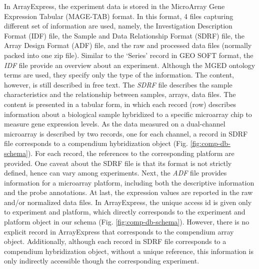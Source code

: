 %
In ArrayExpress, the experiment data is stored in the MicroArray Gene
Expression Tabular (MAGE-TAB) format.
%
In this format, 4 files capturing different set of information are used,
namely, the Investigation Description Format (IDF) file, the Sample and Data
Relationship Format (SDRF) file, the Array Design Format (ADF) file, and the
raw and processed data files (normally packed into one zip file).
%
Similar to the `Series' record in GEO SOFT format, the \textit{IDF} file
provide an overview about an experiment.
%
Although the MGED ontology terms are used, they specify only the type of the
information.  The content, however, is still described in free text.
%
The \textit{SDRF} file describes the sample characteristics and the
relationship between samples, arrays, data files.
%
The content is presented in a tabular form, in which each record (row)
describes information about a biological sample hybridized to a specific
microarray chip to measure gene expression levels.
%
As the data measured on a dual-channel microarray is described by two
records, one for each channel, a record in SDRF file corresponds to a
compendium hybridization object (Fig. \ref{fig:comp-db-schema}).
%
For each record, the references to the corresponding platform are
provided.
%
One caveat about the SDRF file is that its format is not strictly defined,
hence can vary among experiments.
%
Next, the \textit{ADF} file provides information for a microarray platform,
including both the descriptive information and the probe annotations.
%
At last, the expression values are reported in the raw and/or normalized
data files.
%
In ArrayExpress, the unique access id is given only to experiment and
platform, which directly corresponds to the experiment and platform object
in our schema (Fig. \ref{fig:comp-db-schema}).
%
However, there is no explicit record in ArrayExpress that corresponds to
the compendium array object.  Additionally, although each record in SDRF
file corresponds to a compendium hybridization object, without a unique
reference, this information is only indirectly accessible though the
corresponding experiment.
%

